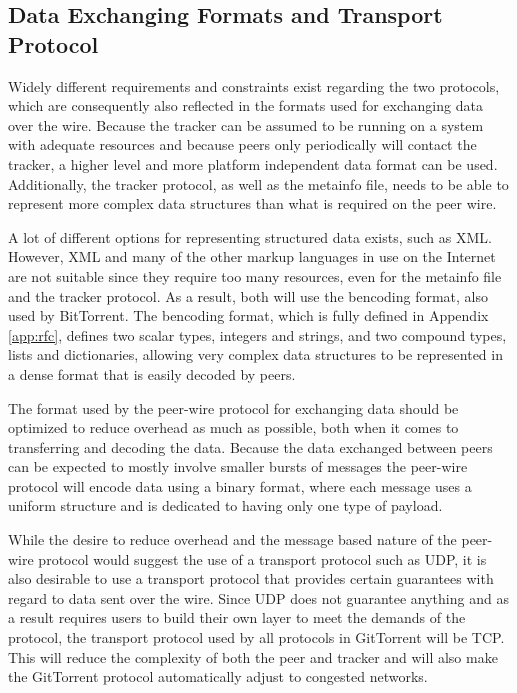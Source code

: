 \subsection{Data Exchanging Formats and Transport Protocol}

Widely different requirements and constraints exist regarding the two
protocols, which are consequently also reflected in the formats used
for exchanging data over the wire. Because the tracker can be assumed
to be running on a system with adequate resources and because peers
only periodically will contact the tracker, a higher level and more
platform independent data format can be used. Additionally, the
tracker protocol, as well as the metainfo file, needs to be able to
represent more complex data structures than what is required on the
peer wire.

A lot of different options for representing structured data exists,
such as XML. However, XML and many of the other markup languages in
use on the Internet are not suitable since they require too many
resources, even for the metainfo file and the tracker protocol. As a
result, both will use the bencoding format, also used by BitTorrent.
The bencoding format, which is fully defined in Appendix
\ref{app:rfc}, defines two scalar types, integers and strings, and two
compound types, lists and dictionaries, allowing very complex
data structures to be represented in a dense format that is easily
decoded by peers.


The format used by the peer-wire protocol for exchanging data should
be optimized to reduce overhead as much as possible, both when it
comes to transferring and decoding the data. Because the data exchanged
between peers can be expected to mostly involve smaller bursts of
messages the peer-wire protocol will encode data using a binary
format, where each message uses a uniform structure and is dedicated
to having only one type of payload.

While the desire to reduce overhead and the message based nature of
the peer-wire protocol would suggest the use of a transport protocol
such as UDP, it is also desirable to use a transport protocol that
provides certain guarantees with regard to data sent over the wire.
Since UDP does not guarantee anything and as a result requires users
to build their own layer to meet the demands of the protocol, the
transport protocol used by all protocols in GitTorrent will be TCP.
This will reduce the complexity of both the peer and tracker and will
also make the GitTorrent protocol automatically adjust to congested
networks.

